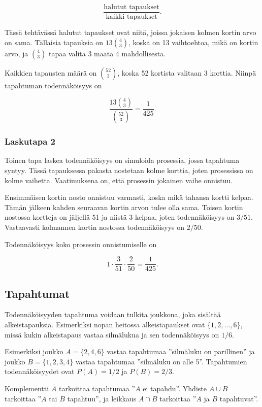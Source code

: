 \[\frac{\textrm{halutut tapaukset}}{\textrm{kaikki tapaukset}}.\]

Tässä tehtävässä halutut tapaukset ovat niitä,
joissa jokaisen kolmen kortin arvo on sama.
Tällaisia tapauksia on $13 {4 \choose 3}$,
koska on 13 vaihtoehtoa, mikä on kortin arvo,
ja ${4 \choose 3}$ tapaa valita 3 maata 4 mahdollisesta.

Kaikkien tapausten määrä on ${52 \choose 3}$,
koska 52 kortista valitaan 3 korttia.
Niinpä tapahtuman todennäköisyys on

\[\frac{13 {4 \choose 3}}{{52 \choose 3}} = \frac{1}{425}.\]

\subsubsection*{Laskutapa 2}

Toinen tapa laskea todennäköisyys on simuloida prosessia,
jossa tapahtuma syntyy.
Tässä tapauksessa pakasta nostetaan kolme korttia,
joten prosessissa on kolme vaihetta.
Vaatimuksena on, että prosessin jokainen vaihe onnistuu.

Ensimmäisen kortin nosto onnistuu varmasti,
koska mikä tahansa kortti kelpaa.
Tämän jälkeen kahden seuraavan kortin
arvon tulee olla sama.
Toisen kortin nostossa kortteja on jäljellä 51
ja niistä 3 kelpaa, joten todennäköisyys on $3/51$.
Vastaavasti kolmannen kortin nostossa
todennäköisyys on $2/50$.

Todennäköisyys koko prosessin onnistumiselle on

\[1 \cdot \frac{3}{51} \cdot \frac{2}{50} = \frac{1}{425}.\]

\subsection{Tapahtumat}

Todennäköisyyden tapahtuma voidaan tulkita
joukkona, joka sisältää alkeistapauksia.
Esimerkiksi nopan heitossa alkeistapaukset
ovat $\{1,2,\ldots,6\}$, missä kukin
alkeistapaus vastaa silmälukua
ja sen todennäköisyys on $1/6$.

Esimerkiksi joukko $A=\{2,4,6\}$
vastaa tapahtumaa ''silmäluku on parillinen''
ja joukko $B=\{1,2,3,4\}$ vastaa tapahtumaa
''silmäluku on alle 5''.
Tapahtumien todennäköisyydet ovat $P(A)=1/2$
ja $P(B)=2/3$.

Komplementti $\bar A$
tarkoittaa tapahtumaa ''$A$ ei tapahdu''.
Yhdiste $A \cup B$
tarkoittaa ''$A$ tai $B$ tapahtuu'',
ja leikkaus
$A \cap B$ tarkoittaa
''$A$ ja $B$ tapahtuvat''.

